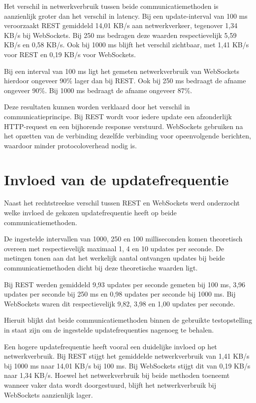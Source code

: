 Het verschil in netwerkverbruik tussen beide communicatiemethoden is
aanzienlijk groter dan het verschil in latency. Bij een update-interval van
100 ms veroorzaakt REST gemiddeld 14,01 KB/s aan netwerkverkeer, tegenover
1,34 KB/s bij WebSockets. Bij 250 ms bedragen deze waarden respectievelijk
5,59 KB/s en 0,58 KB/s. Ook bij 1000 ms blijft het verschil zichtbaar, met
1,41 KB/s voor REST en 0,19 KB/s voor WebSockets.

Bij een interval van 100 ms ligt het gemeten netwerkverbruik van WebSockets
hierdoor ongeveer 90\% lager dan bij REST. Ook bij 250 ms bedraagt de afname
ongeveer 90\%. Bij 1000 ms bedraagt de afname ongeveer 87\%.

Deze resultaten kunnen worden verklaard door het verschil in
communicatieprincipe. Bij REST wordt voor iedere update een afzonderlijk
HTTP-request en een bijhorende response verstuurd. WebSockets gebruiken na het
opzetten van de verbinding dezelfde verbinding voor opeenvolgende berichten,
waardoor minder protocoloverhead nodig is.


\section{Invloed van de updatefrequentie}

Naast het rechtstreekse verschil tussen REST en WebSockets werd onderzocht
welke invloed de gekozen updatefrequentie heeft op beide communicatiemethoden.

De ingestelde intervallen van 1000, 250 en 100 milliseconden komen theoretisch
overeen met respectievelijk maximaal 1, 4 en 10 updates per seconde. De
metingen tonen aan dat het werkelijk aantal ontvangen updates bij beide
communicatiemethoden dicht bij deze theoretische waarden ligt.

Bij REST werden gemiddeld 9,93 updates per seconde gemeten bij 100 ms,
3,96 updates per seconde bij 250 ms en 0,98 updates per seconde bij 1000 ms.
Bij WebSockets waren dit respectievelijk 9,82, 3,98 en 1,00 updates per
seconde.

Hieruit blijkt dat beide communicatiemethoden binnen de gebruikte testopstelling
in staat zijn om de ingestelde updatefrequenties nagenoeg te behalen.

Een hogere updatefrequentie heeft vooral een duidelijke invloed op het
netwerkverbruik. Bij REST stijgt het gemiddelde netwerkverbruik van 1,41 KB/s
bij 1000 ms naar 14,01 KB/s bij 100 ms. Bij WebSockets stijgt dit van
0,19 KB/s naar 1,34 KB/s. Hoewel het netwerkverbruik bij beide methoden
toeneemt wanneer vaker data wordt doorgestuurd, blijft het netwerkverbruik bij
WebSockets aanzienlijk lager.

